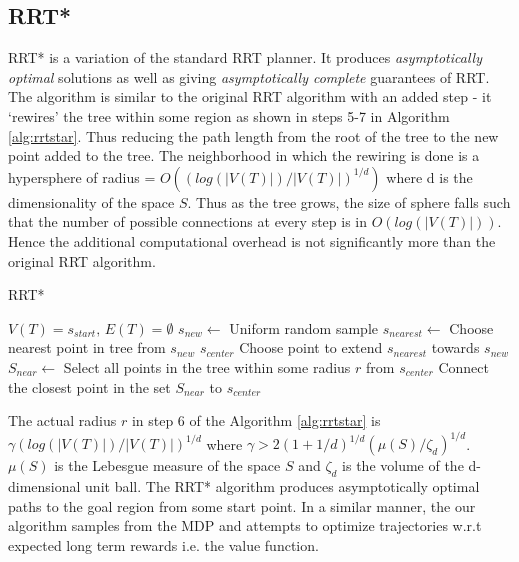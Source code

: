 \documentclass{article} %
\begin{document}
\subsection{RRT*}
RRT* is a variation of the standard RRT planner. It produces \emph{asymptotically optimal} solutions as well as giving \emph{asymptotically complete} guarantees of RRT\cite{rrtstar}. The algorithm is similar to the original RRT algorithm with an added step - it `rewires' the tree within some region as shown in steps 5-7 in Algorithm \ref{alg:rrtstar}. Thus reducing the path length from the root of the tree to the new point added to the tree. The neighborhood in which the rewiring is done is a hypersphere of radius = $O((log(|V(T)|)/|V(T)|)^{1/d})$ where d is the dimensionality of the space $S$. Thus as the tree grows, the size of sphere falls such that the number of possible connections at every step is in $O(log(|V(T)|))$. Hence the additional computational overhead is not significantly more than the original RRT algorithm. 
\begin{algorithm}
\caption{RRT*}
\label{alg:rrtstar}
\begin{algorithmic}[1]
\State $V(T)=s_{start},\,E(T)=\emptyset$
\Repeat 
	\State $s_{new}\leftarrow $ Uniform random sample
	\State $s_{nearest}\leftarrow $ Choose nearest point in tree from $s_{new}$
	\State $s_{center}$ Choose point to extend $s_{nearest}$ towards $s_{new}$
	\State $S_{near}\leftarrow $ Select all points in the tree within some radius $r$ from $s_{center}$
	\State Connect the closest point in the set $S_{near}$ to $s_{center}$
\end{algorithmic}
\end{algorithm}
The actual radius $r$ in step 6 of the Algorithm \ref{alg:rrtstar} is $\gamma(log(|V(T)|)/|V(T)|)^{1/d}$ where $\gamma > 2(1+1/d)^{1/d}(\mu(S)/\zeta_d)^{1/d} $. $\mu(S)$ is the Lebesgue measure of the space $S$ and $\zeta_d$ is the volume of the d-dimensional unit ball. 
The RRT* algorithm produces asymptotically optimal paths to the goal region from some start point. In a similar manner, the our algorithm samples from the MDP and attempts to optimize trajectories w.r.t expected long term rewards i.e. the value function.
\end{document}
